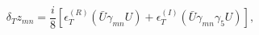 \begin{equation}\label{24}
\delta_T z_{mn}=\frac{i}{8}[\epsilon^{(R)}_T(\bar 
U\gamma_{mn}U)+\epsilon^{(I)}_T(\bar U\gamma_{mn}\gamma_5 U)],
\end{equation}

